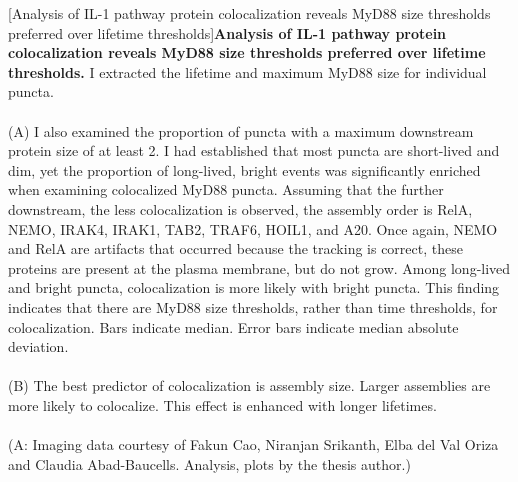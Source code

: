 \begin{centering}
\captionsetup{parbox=none}
[Analysis of IL-1 pathway protein colocalization reveals MyD88 size thresholds preferred over lifetime thresholds]{\textbf{Analysis of IL-1 pathway protein colocalization reveals MyD88 size thresholds preferred over lifetime thresholds.} I extracted the lifetime and maximum MyD88 size for individual puncta.
\\
\\
(A) I also examined the proportion of puncta with a maximum downstream protein size of at least 2\times. I had established that most puncta are short-lived and dim, yet the proportion of long-lived, bright events was significantly enriched when examining colocalized MyD88 puncta. Assuming that the further downstream, the less colocalization is observed, the assembly order is RelA, NEMO, IRAK4, IRAK1, TAB2, TRAF6, HOIL1, and A20. Once again, NEMO and RelA are artifacts that occurred because the tracking is correct, these proteins are present at the plasma membrane, but do not grow. Among long-lived and bright puncta, colocalization is more likely with bright puncta. This finding indicates that there are MyD88 size thresholds, rather than time thresholds, for colocalization. Bars indicate median. Error bars indicate median absolute deviation.
\\
\\
(B) The best predictor of colocalization is assembly size. Larger assemblies are more likely to colocalize. This effect is enhanced with longer lifetimes.
\\
\\
(A: Imaging data courtesy of Fakun Cao, Niranjan Srikanth, Elba del Val Oriza and Claudia Abad-Baucells. Analysis, plots by the thesis author.)}
\label{p2:S3}
\end{centering}

